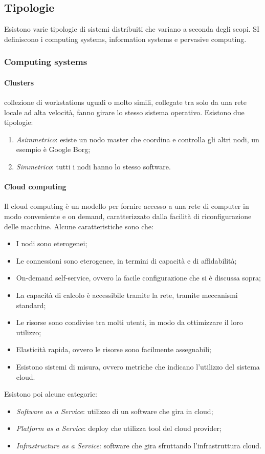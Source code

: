 \subsection{Tipologie}
Esistono varie tipologie di sistemi distribuiti che variano a seconda degli 
scopi. SI definiscono i computing systems, information systems e pervasive computing.
\subsubsection{Computing systems}
\paragraph{Clusters} collezione di workstations uguali o molto simili, 
collegate tra solo da una rete locale ad alta velocità, fanno girare lo 
stesso sistema operativo.
Esistono due tipologie:
\begin{enumerate}
    \item \emph{Asimmetrico}: esiste un nodo master che coordina 
    e controlla gli altri nodi, un esempio è Google Borg;
    \item \emph{Simmetrico}: tutti i nodi hanno lo stesso software.
\end{enumerate}

\paragraph{Cloud computing}
Il cloud computing è un modello per fornire accesso a una rete di 
computer in modo conveniente e on demand, caratterizzato dalla 
facilità di riconfigurazione delle macchine.
Alcune caratteristiche sono che:
\begin{itemize}
    \item I nodi sono eterogenei;
    \item Le connessioni sono eterogenee, in termini di capacità e di affidabilità;
    \item On-demand self-service, ovvero la facile configurazione che si è discussa sopra;
    \item La capacità di calcolo è accessibile tramite la rete, tramite meccanismi 
    standard;
    \item Le risorse sono condivise tra molti utenti, in modo da ottimizzare il loro utilizzo;
    \item Elasticità rapida, ovvero le risorse sono facilmente assegnabili;
    \item Esistono sistemi di misura, ovvero metriche che indicano l'utilizzo 
    del sistema cloud.
\end{itemize}
Esistono poi alcune categorie: 
\begin{itemize}
    \item \emph{Software as a Service}: utilizzo di un software che gira in cloud;
    \item \emph{Platform as a Service}: deploy che utilizza tool del cloud provider;
    \item \emph{Infrastructure as a Service}: software che gira sfruttando l'infrastruttura cloud.
\end{itemize}

